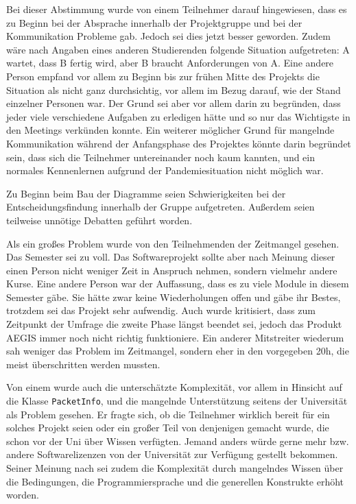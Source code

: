 \documentclass[../review_3.tex]{subfiles}
\begin{document}
Bei dieser Abstimmung wurde von einem Teilnehmer darauf hingewiesen, dass es zu Beginn bei der Absprache innerhalb der Projektgruppe und bei der Kommunikation Probleme gab. Jedoch sei dies jetzt besser geworden. Zudem wäre nach Angaben eines anderen Studierenden folgende Situation aufgetreten: \glqq A wartet, dass B fertig wird, aber B braucht Anforderungen von A\grqq{}. Eine andere Person empfand vor allem zu Beginn bis zur frühen Mitte des Projekts die Situation als nicht ganz durchsichtig, vor allem im Bezug darauf, wie der Stand einzelner Personen war. Der Grund sei aber vor allem darin zu begründen, dass jeder viele verschiedene Aufgaben zu erledigen hätte und so nur das Wichtigste in den Meetings verkünden konnte. Ein weiterer möglicher Grund für mangelnde Kommunikation während der Anfangsphase des Projektes könnte darin begründet sein, dass sich die Teilnehmer untereinander noch kaum kannten, und ein normales Kennenlernen aufgrund der Pandemiesituation nicht möglich war.

Zu Beginn beim Bau der Diagramme seien Schwierigkeiten bei der Entscheidungsfindung innerhalb der Gruppe aufgetreten. Außerdem seien teilweise unnötige Debatten geführt worden.

Als ein großes Problem wurde von den Teilnehmenden der Zeitmangel gesehen. Das Semester sei zu voll. Das Softwareprojekt sollte aber nach Meinung dieser einen Person nicht weniger Zeit in Anspruch nehmen, sondern vielmehr andere Kurse. Eine andere Person war der Auffassung, dass es zu viele Module in diesem Semester gäbe. Sie hätte zwar keine Wiederholungen offen und gäbe ihr Bestes, trotzdem sei das Projekt sehr aufwendig. Auch wurde kritisiert, dass zum Zeitpunkt der Umfrage die zweite Phase längst beendet sei, jedoch das Produkt AEGIS immer noch nicht richtig funktioniere. Ein anderer Mitstreiter wiederum sah weniger das Problem im Zeitmangel, sondern eher in den vorgegeben 20h, die meist überschritten werden mussten.

Von einem wurde auch die unterschätzte Komplexität, vor allem in Hinsicht auf die Klasse \texttt{PacketInfo}, und die mangelnde Unterstützung seitens der Universität als Problem gesehen. Er fragte sich, ob die Teilnehmer wirklich bereit für ein solches Projekt seien oder ein großer Teil von denjenigen gemacht wurde, die schon vor der Uni über Wissen verfügten. Jemand anders würde gerne mehr bzw. andere Softwarelizenzen von der Universität zur Verfügung gestellt bekommen. Seiner Meinung nach sei zudem die Komplexität durch mangelndes Wissen über die Bedingungen, die Programmiersprache und die generellen Konstrukte erhöht worden.
\end{document}
